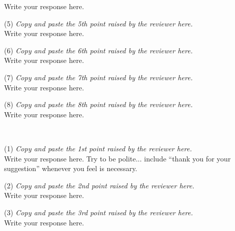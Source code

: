 \documentclass[a4,12pt]{article}
\begin{document}
Write your response here. \\

\vspace{10pt}

\noindent (5) \emph{ \color{blue} Copy and paste the 5th point raised by the reviewer here.} \\

Write your response here. \\

\vspace{10pt}

\noindent (6) \emph{ \color{blue} Copy and paste the 6th point raised by the reviewer here.} \\

Write your response here. \\

\vspace{10pt}

\noindent (7) \emph{ \color{blue} Copy and paste the 7th point raised by the reviewer here.} \\

Write your response here. \\

\vspace{10pt}

\noindent (8) \emph{ \color{blue} Copy and paste the 8th point raised by the reviewer here.} \\

Write your response here. \\

\vspace{10pt}

\newpage

 \\

\vspace{5pt}

\noindent (1) \emph{ \color{blue} Copy and paste the 1st point raised by the reviewer here.} \\

Write your response here. Try to be polite... include ``thank you for your suggestion'' whenever you feel is necessary. \\

\vspace{5pt}

\noindent (2) \emph{ \color{blue} Copy and paste the 2nd point raised by the reviewer here.} \\

Write your response here. \\

\vspace{5pt}

\noindent (3) \emph{ \color{blue} Copy and paste the 3rd point raised by the reviewer here.} \\

Write your response here. \\
\end{document}
